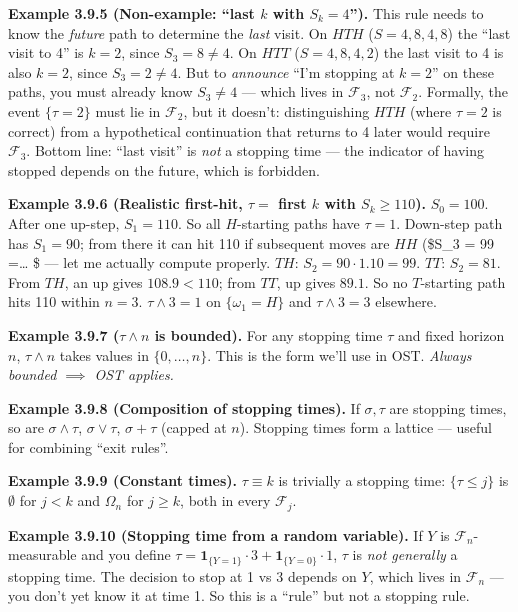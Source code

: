 \documentclass[
  10pt,
  twoside]{book}
\begin{document}
\textbf{Example 3.9.5 (Non-example: ``last \(k\) with \(S_k = 4\)'').}
This rule needs to know the \emph{future} path to determine the
\emph{last} visit. On \(HTH\) (\(S = 4,8,4,8\)) the ``last visit to 4''
is \(k=2\), since \(S_3 = 8 \ne 4\). On \(HTT\) (\(S = 4,8,4,2\)) the
last visit to 4 is also \(k=2\), since \(S_3 = 2 \ne 4\). But to
\emph{announce} ``I'm stopping at \(k = 2\)'' on these paths, you must
already know \(S_3 \ne 4\) --- which lives in \(\mathcal F_3\), not
\(\mathcal F_2\). Formally, the event \(\{\tau = 2\}\) must lie in
\(\mathcal F_2\), but it doesn't: distinguishing \(HTH\) (where
\(\tau = 2\) is correct) from a hypothetical continuation that returns
to 4 later would require \(\mathcal F_3\). Bottom line: ``last visit''
is \emph{not} a stopping time --- the indicator of having stopped
depends on the future, which is forbidden.

\textbf{Example 3.9.6 (Realistic first-hit, \(\tau =\) first \(k\) with
\(S_k \ge 110\)).} \(S_0 = 100\). After one up-step, \(S_1 = 110\). So
all \(H\)-starting paths have \(\tau = 1\). Down-step path has
\(S_1 = 90\); from there it can hit 110 if subsequent moves are \(HH\)
(\$S\_3 = 99  =\ldots{} \$ --- let me actually compute
properly. \(TH\): \(S_2 = 90 \cdot 1.10 = 99\). \(TT\): \(S_2 = 81\).
From \(TH\), an up gives \(108.9 < 110\); from \(TT\), up gives
\(89.1\). So no \(T\)-starting path hits 110 within \(n=3\).
\(\tau \wedge 3 = 1\) on \(\{\omega_1=H\}\) and \(\tau \wedge 3 = 3\)
elsewhere.

\textbf{Example 3.9.7 (\(\tau \wedge n\) is bounded).} For any stopping
time \(\tau\) and fixed horizon \(n\), \(\tau \wedge n\) takes values in
\(\{0,\ldots,n\}\). This is the form we'll use in OST. \emph{Always
bounded \(\implies\) OST applies.}

\textbf{Example 3.9.8 (Composition of stopping times).} If
\(\sigma, \tau\) are stopping times, so are \(\sigma \wedge \tau\),
\(\sigma \vee \tau\), \(\sigma + \tau\) (capped at \(n\)). Stopping
times form a lattice --- useful for combining ``exit rules''.

\textbf{Example 3.9.9 (Constant times).} \(\tau \equiv k\) is trivially
a stopping time: \(\{\tau \le j\}\) is \(\emptyset\) for \(j < k\) and
\(\Omega_n\) for \(j \ge k\), both in every \(\mathcal F_j\).

\textbf{Example 3.9.10 (Stopping time from a random variable).} If \(Y\)
is \(\mathcal F_n\)-measurable and you define
\(\tau = \mathbf 1_{\{Y = 1\}} \cdot 3 + \mathbf 1_{\{Y = 0\}} \cdot 1\),
\(\tau\) is \emph{not generally} a stopping time. The decision to stop
at 1 vs 3 depends on \(Y\), which lives in \(\mathcal F_n\) --- you
don't yet know it at time 1. So this is a ``rule'' but not a stopping
rule.
\end{document}
